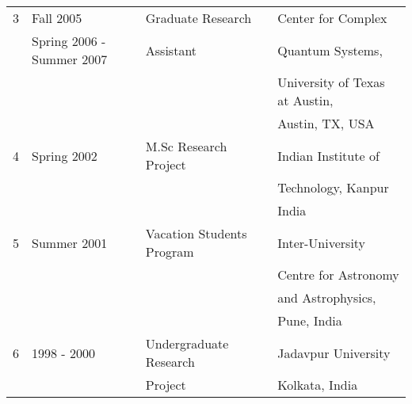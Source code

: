 \documentclass[a4paper,11pt,color]{article}
\begin{document}
\begin{tabular}{|l|l|l|l|}
3      & Fall 2005                          & Graduate Research                       &Center for Complex\\
       & Spring 2006 - Summer 2007          & Assistant                               &Quantum Systems, \\
       &                                    &                                         &University of Texas at Austin,\\
       &                                    &                                         &Austin, TX, USA\\
\hline        
4      & Spring 2002                        & M.Sc Research Project                   &Indian Institute of\\
       &                                    &                                         &Technology, Kanpur \\
       &                                    &                                         &India \\
\hline
5      & Summer 2001                        & Vacation Students Program               &Inter-University \\
       &                                    &                                         &Centre for Astronomy\\
       &                                    &                                         &and Astrophysics, \\
       &                                    &                                         &Pune, India\\
\hline
6      & 1998 - 2000                        & Undergraduate Research                  &Jadavpur University\\
       &                                    & Project                                 &Kolkata, India\\
\hline
\end{tabular} 
\end{document}

